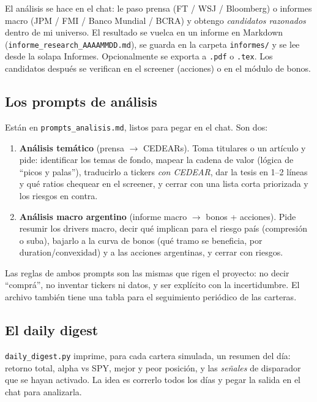 \documentclass[11pt,a4paper]{article}
\newcommand{\fpath}[1]{\texttt{#1}}
\begin{document}
El an\'alisis se hace en el chat: le paso prensa (FT / WSJ / Bloomberg) o informes
macro (JPM / FMI / Banco Mundial / BCRA) y obtengo \emph{candidatos razonados} dentro
de mi universo. El resultado se vuelca en un informe en Markdown
(\fpath{informe\_research\_AAAAMMDD.md}), se guarda en la carpeta \fpath{informes/} y se
lee desde la solapa Informes. Opcionalmente se exporta a \fpath{.pdf} o \fpath{.tex}.
Los candidatos despu\'es se verifican en el screener (acciones) o en el m\'odulo de
bonos.

\subsection{Los prompts de an\'alisis}

Est\'an en \fpath{prompts\_analisis.md}, listos para pegar en el chat. Son dos:

\begin{enumerate}[leftmargin=1.4em]
  \item \textbf{An\'alisis tem\'atico} (prensa $\rightarrow$ CEDEARs). Toma titulares o
  un art\'iculo y pide: identificar los temas de fondo, mapear la cadena de valor
  (l\'ogica de ``picos y palas''), traducirlo a tickers \emph{con CEDEAR}, dar la tesis
  en 1--2 l\'ineas y qu\'e ratios chequear en el screener, y cerrar con una lista corta
  priorizada y los riesgos en contra.
  \item \textbf{An\'alisis macro argentino} (informe macro $\rightarrow$ bonos +
  acciones). Pide resumir los drivers macro, decir qu\'e implican para el riesgo pa\'is
  (compresi\'on o suba), bajarlo a la curva de bonos (qu\'e tramo se beneficia, por
  duration/convexidad) y a las acciones argentinas, y cerrar con riesgos.
\end{enumerate}

Las reglas de ambos prompts son las mismas que rigen el proyecto: no decir
``comprá'', no inventar tickers ni datos, y ser expl\'icito con la incertidumbre. El
archivo tambi\'en tiene una tabla para el seguimiento peri\'odico de las carteras.

\subsection{El daily digest}

\fpath{daily\_digest.py} imprime, para cada cartera simulada, un resumen del d\'ia:
retorno total, alpha vs SPY, mejor y peor posici\'on, y las \emph{se\~nales} de
disparador que se hayan activado. La idea es correrlo todos los d\'ias y pegar la
salida en el chat para analizarla.
\end{document}
